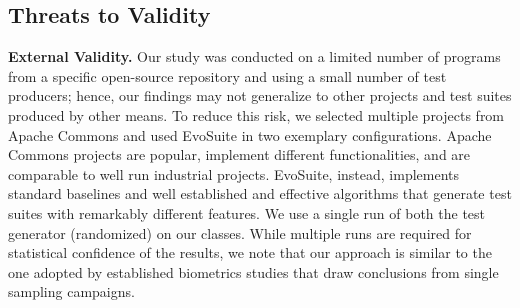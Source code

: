 \documentclass[sigconf,review,anonymous]{acmart}
\begin{document}

%







\subsection{Threats to Validity}

\noindent\textbf{External Validity.}
Our study was conducted on a limited number of programs from a specific
open-source repository and using a small number of test producers;
hence, our findings
may not generalize to other projects and test suites produced by other means.
%
To reduce this risk, we selected multiple projects from Apache Commons and
used EvoSuite in two exemplary configurations.
%
Apache Commons projects are popular, implement different functionalities, and
are comparable to %
well run industrial projects.
EvoSuite, instead, implements standard baselines %
and
well established and effective algorithms %
that generate test suites with remarkably different features.
We use a single run of both the test generator (randomized) on our classes.
%
While multiple runs are required for statistical confidence of the results,
we note that our approach is similar to the one adopted by established biometrics
studies that draw conclusions from single sampling campaigns.
\end{document}
